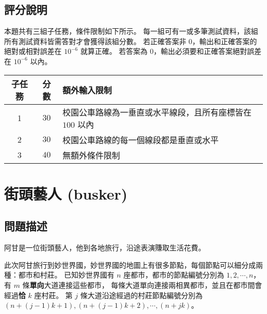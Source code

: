 \subsection{評分說明}

本題共有三組子任務，條件限制如下所示。
每一組可有一或多筆測試資料，該組所有測試資料皆需答對才會獲得該組分數。
若正確答案非 \begin{math}0\end{math}，輸出和正確答案的絕對或相對誤差在
\begin{math}10^{-6}\end{math} 就算正確。 若答案為
\begin{math}0\end{math}，輸出必須要和正確答案絕對誤差在
\begin{math}10^{-6}\end{math} 以內。

\begin{longtable}[]{@{}ccl@{}}
\toprule
子任務 & 分數 & 額外輸入限制 \\
\midrule
\endhead
1 & \(30\) & 校園公車路線為一垂直或水平線段，且所有座標皆在
\begin{math}100\end{math} 以內 \\
2 & \(30\) & 校園公車路線的每一個線段都是垂直或水平 \\
3 & \(40\) & 無額外條件限制 \\
\bottomrule
\end{longtable}

\section{街頭藝人 (busker)}

\subsection{問題描述}

阿甘是一位街頭藝人，他到各地旅行，沿途表演賺取生活花費。

此次阿甘旅行到妙世界國，妙世界國的地圖上有很多節點，每個節點可以細分成兩種：都市和村莊。
已知妙世界國有 \begin{math}n\end{math} 座都市，都市的節點編號分別為
\(1, 2, \cdots, n\)， 有 \begin{math}m\end{math}
條\textbf{單向}大道連接這些都市，
每條大道單向連接兩相異都市，並且在都市間會經過\textbf{恰} \(k\) 座村莊。
第 \begin{math}j\end{math} 條大道沿途經過的村莊節點編號分別為
\((n + (j-1)k + 1), (n + (j-1)k + 2), \cdots, (n + jk)\)。

